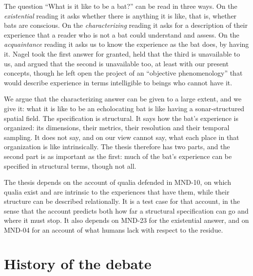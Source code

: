 \documentclass{situationist-preprint}
\begin{document}
The question \enquote{What is it like to be a bat?} can be read in three ways. On the \emph{existential} reading it asks whether there is anything it is like, that is, whether bats are conscious. On the \emph{characterizing} reading it asks for a description of their experience that a reader who is not a bat could understand and assess. On the \emph{acquaintance} reading it asks us to know the experience as the bat does, by having it. Nagel took the first answer for granted, held that the third is unavailable to us, and argued that the second is unavailable too, at least with our present concepts, though he left open the project of an \enquote{objective phenomenology} that would describe experience in terms intelligible to beings who cannot have it.

We argue that the characterizing answer can be given to a large extent, and we give it: what it is like to be an echolocating bat is like having a sonar-structured spatial field. The specification is structural. It says how the bat's experience is organized: its dimensions, their metrics, their resolution and their temporal sampling. It does not say, and on our view cannot say, what each place in that organization is like intrinsically. The thesis therefore has two parts, and the second part is as important as the first: much of the bat's experience can be specified in structural terms, though not all.

The thesis depends on the account of qualia defended in MND-10, on which qualia exist and are intrinsic to the experiences that have them, while their structure can be described relationally. It is a test case for that account, in the sense that the account predicts both how far a structural specification can go and where it must stop. It also depends on MND-23 for the existential answer, and on MND-04 for an account of what humans lack with respect to the residue.

\section{History of the debate}\label{s:history}
\end{document}
